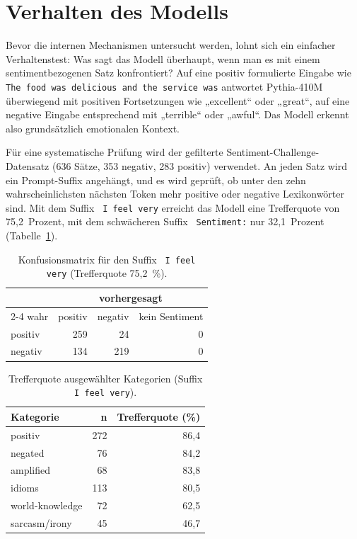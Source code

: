 \section{Verhalten des Modells}

Bevor die internen Mechanismen untersucht werden, lohnt sich ein einfacher Verhaltenstest: Was sagt das Modell überhaupt, wenn man es mit einem sentimentbezogenen Satz konfrontiert? Auf eine positiv formulierte Eingabe wie \texttt{The food was delicious and the service was} antwortet Pythia-410M überwiegend mit positiven Fortsetzungen wie „excellent“ oder „great“, auf eine negative Eingabe entsprechend mit „terrible“ oder „awful“. Das Modell erkennt also grundsätzlich emotionalen Kontext.

Für eine systematische Prüfung wird der gefilterte Sentiment-Challenge-Datensatz (636 Sätze, 353 negativ, 283 positiv) verwendet. An jeden Satz wird ein Prompt-Suffix angehängt, und es wird geprüft, ob unter den zehn wahrscheinlichsten nächsten Token mehr positive oder negative Lexikonwörter sind. Mit dem Suffix \texttt{ I feel very} erreicht das Modell eine Trefferquote von 75,2~Prozent, mit dem schwächeren Suffix \texttt{ Sentiment:} nur 32,1~Prozent (Tabelle~\ref{tab:cm1}).

\begin{table}[htbp]
  \centering
  \caption{Konfusionsmatrix für den Suffix \texttt{ I feel very} (Trefferquote 75,2~\%).}
  \label{tab:cm1}
  \begin{tabular}{lrrr}
    \toprule
    & \multicolumn{3}{c}{vorhergesagt} \\
    \cmidrule(lr){2-4}
    wahr & positiv & negativ & kein Sentiment \\
    \midrule
    positiv & 259 & 24 & 0 \\
    negativ & 134 & 219 & 0 \\
    \bottomrule
  \end{tabular}
\end{table}

\begin{table}[htbp]
  \centering
  \caption{Trefferquote ausgewählter Kategorien (Suffix \texttt{ I feel very}).}
  \label{tab:catacc_short}
  \begin{tabular}{lrr}
    \toprule
    Kategorie & n & Trefferquote (\%) \\
    \midrule
    positiv & 272 & 86,4 \\
    negated & 76 & 84,2 \\
    amplified & 68 & 83,8 \\
    idioms & 113 & 80,5 \\
    world-knowledge & 72 & 62,5 \\
    sarcasm/irony & 45 & 46,7 \\
    \bottomrule
  \end{tabular}
\end{table}

